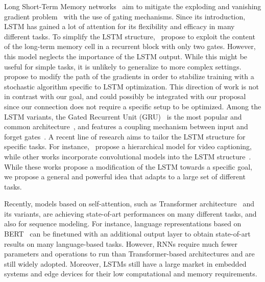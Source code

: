 Long Short-Term Memory networks~\citep{hochreiter1997long} aim to mitigate the exploding and vanishing gradient problem~\citep{hochreiter1991untersuchungen, bengio1994learning} with the use of gating mechanisms. Since its introduction, LSTM has gained a lot of attention for its flexibility and efficacy in many different tasks.
%
To simplify the LSTM structure,~\citet{liu2020simplified} propose to exploit the content of the long-term memory cell in a recurrent block with only two gates. However, this model neglects the importance of the LSTM output. While this might be useful for simple tasks, it is unlikely to generalize to more complex settings.~\citet{arpit2018h} propose to modify the path of the gradients in order to stabilize training with a stochastic algorithm specific to LSTM optimization. This direction of work is not in contrast with our goal, and could possibly be integrated with our proposal since our connection does not require a specific setup to be optimized.
%
Among the LSTM variants, the Gated Recurrent Unit (GRU)~\citep{cho2014LearningPR,cho2014properties} is the most popular and common architecture~\citep{chung2014empirical}, and features a coupling mechanism between input and forget gates~\citep{Greff2017LSTMAS}.
%
A recent line of research aims to tailor the LSTM structure for specific tasks. For instance,~\citet{baraldi2017hierarchical} propose a hierarchical model for video captioning, while other works incorporate convolutional models into the LSTM structure~\citep{XIAO2020173, LI201841}.
While these works propose a modification of the LSTM towards a specific goal, we propose a general and powerful idea that adapts to a large set of different tasks.

Recently, models based on self-attention, such as Transformer architecture~\citep{vaswani2017attention} and its variants, are achieving state-of-art performances on many different tasks, and also for sequence modeling. For instance, language representations based on BERT~\citep{devlin2018bert} can be finetuned with an additional output layer to obtain state-of-art results on many language-based tasks. However, RNNs require much fewer parameters and operations to run than Transformer-based architectures and are still widely adopted.
Moreover, LSTMs still have a large market in embedded systems and edge devices for their low computational and memory requirements.